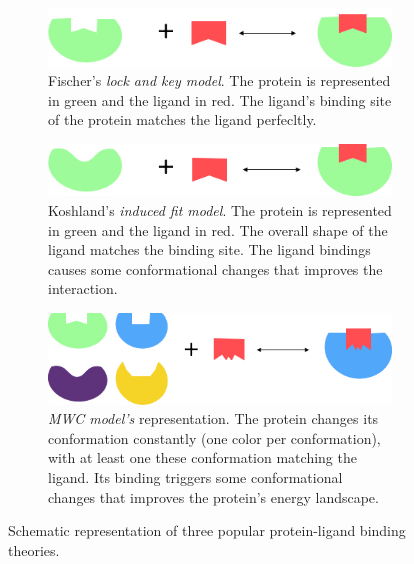 \documentclass[12pt, a4paper,twoside]{tesi_upf}
\begin{document}
\begin{figure}[!tbp]
  
  \centering
    \begin{subfigure}[b]{0.75\textwidth}
	\includegraphics[width=1\linewidth]{../figures/lock_key_model.jpg}
	\caption{Fischer's \textit{lock and key model}. The protein is represented in green and the ligand in red. The ligand's binding site of the protein matches the ligand perfecltly.}
	\label{fig:lock_and_key_model}
	\vspace*{4mm}
	\end{subfigure}
	\begin{subfigure}[b]{0.75\textwidth}
	\includegraphics[width=1\linewidth]{../figures/induce_fit_model.jpg}
	\caption{Koshland's \textit{induced fit model}. The protein is represented in green and the ligand in red. The overall shape of the ligand matches the binding site. The ligand bindings causes some conformational changes that improves the interaction.}
	\label{fig:induced_fit_model}
	\vspace*{4mm}
	\end{subfigure}
	\begin{subfigure}[b]{0.75\textwidth}
	\includegraphics[width=1\linewidth]{../figures/mwc_model.jpg}
	\caption{\textit{MWC model's} representation. The protein changes its conformation constantly (one color per conformation), with at least one these conformation matching the ligand. Its binding triggers some conformational changes that improves the protein's energy landscape.}
	\label{fig:mwc_model}
	\vspace*{4mm}
	\end{subfigure}
   \caption{Schematic representation of three popular protein-ligand binding theories.}

\end{figure}
\end{document}
